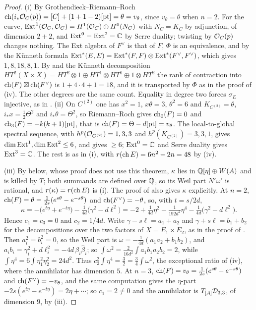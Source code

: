 \begin{proof}
(i) By Grothendieck--Riemann--Roch $\operatorname{ch}(i_{*}\mathcal{O}_{C}(p))=[C]+(1+1-2)[\mathrm{pt}]
=\theta=v_{\theta}$, since $v_{\theta}=\theta$ when $n=2$. For the curve,
$\operatorname{Ext}^{1}(\mathcal{O}_{C},\mathcal{O}_{C})=H^{1}(\mathcal{O}_{C})\oplus H^{0}(N_{C})$ with
$N_{C}=K_{C}$ by adjunction, of dimension $2+2$, and $\operatorname{Ext}^{0}=\operatorname{Ext}^{2}=\mathbb{C}$ by
Serre duality; twisting by $\mathcal{O}_{C}(p)$ changes nothing. The Ext algebra of
$F^{\vee}$ is that of $F$, $\Phi$ is an equivalence, and by the K\"unneth
formula $\operatorname{Ext}^{*}(E,E)=\operatorname{Ext}^{*}(F,F)\otimes\operatorname{Ext}^{*}(F^{\vee},F^{\vee})$, which
gives $1,8,18,8,1$. By  and the K\"unneth
decomposition $HT^{2}(X\times X)=HT^{2}\otimes1\oplus HT^{1}\otimes HT^{1}\oplus
1\otimes HT^{2}$ the rank of contraction into $\operatorname{ch}(F)\boxtimes\operatorname{ch}(F^{\vee})$ is
$1+4\cdot4+1=18$, and it is transported by $\Phi$ as in the proof of
(iv). The other degrees are the same count. Equality in
degree two forces $\sigma_{E}$ injective, as in .
(ii) On $C^{(2)}$ one has $x^{2}=1$, $x\theta=3$, $\theta^{2}=6$ and
$K_{C^{(2)}}=\theta$, $i_{*}x=\frac12\Theta^{2}$ and $i_{*}\theta=\Theta^{2}$, so
Riemann--Roch gives $\operatorname{ch}_{2}(F)=0$ and $\operatorname{ch}_{3}(F)=-k(k+1)[\mathrm{pt}]$, that
is $\operatorname{ch}(F)=\Theta-d[\mathrm{pt}]=v_{\theta}$. The local-to-global spectral
sequence, with $h^{p}(\mathcal{O}_{C^{(2)}})=1,3,3$ and $h^{p}(K_{C^{(2)}})=3,3,1$,
gives $\dim\operatorname{Ext}^{1},\dim\operatorname{Ext}^{2}\le6$, and  gives
$\ge6$; $\operatorname{Ext}^{0}=\mathbb{C}$ and Serre duality gives $\operatorname{Ext}^{3}=\mathbb{C}$. The rest is as
in (i), with $r(\operatorname{ch} E)=6n^{2}-2n=48$ by (iv).

(iii) By  below, whose proof does not use this theorem,
$\kappa$ lies in $\mathbb{Q}[\eta]\oplus W(A)$ and is killed by $T$; both summands
are defined over $\mathbb{Q}$, so its Weil part $N'\omega'$ is rational, and
$r(\kappa)=r(\operatorname{ch} E)$ is (i). The proof of
 also gives $\kappa$ explicitly. At $n=2$,
$\operatorname{ch}(F)=\theta=\frac{1}{2s}(e^{s\theta}-e^{-s\theta})$ and
$\operatorname{ch}(F^{\vee})=-\theta$, so, with $t=s/2d$,
\[
  \kappa=-\bigl(e^{t\eta}+e^{-t\eta}\bigr)-\tfrac{1}{4d}\bigl(\gamma^{2}-d\ell^{2}\bigr)
  =-2+\tfrac{1}{4d}\eta^{2}-\tfrac{1}{192d^{2}}\eta^{4}
   -\tfrac{1}{4d}\bigl(\gamma^{2}-d\ell^{2}\bigr).
\]
Hence $c_{1}=c_{3}=0$ and $c_{2}=1/4d$. Write $\gamma-s\ell=a_{1}+a_{2}$ and
$\gamma+s\ell=b_{1}+b_{2}$ for the decompositions over the two factors of
$X=E_{1}\times E_{2}$, as in the proof of . Then
$a_{i}^{2}=b_{i}^{2}=0$, so the Weil part is
$\omega=-\frac{1}{4d}(a_{1}a_{2}+b_{1}b_{2})$, and
$a_{i}b_{i}=\gamma_{i}^{2}+d\ell_{i}^{2}=-4d\,\beta_{i}\widehat\beta_{i}$; so
$\int\omega^{2}=\frac{2}{16d^{2}}\int a_{1}b_{1}a_{2}b_{2}=2$, while
$\int\eta^{4}=6\int\eta_{1}^{2}\eta_{2}^{2}=24d^{2}$. Thus
$c_{2}^{2}\int\eta^{4}=\frac32=\frac34\int\omega^{2}$, the exceptional ratio of
(iv), where the annihilator has dimension $5$. At
$n=3$, $\operatorname{ch}(F)=v_{\theta}=\frac{1}{2s}(e^{s\theta}-e^{-s\theta})$ and
$\operatorname{ch}(F^{\vee})=-v_{\theta}$, and the same computation gives the
$\eta$-part $-2s(e^{t\eta}-e^{-t\eta})=2\eta+\cdots$; so $c_{1}=2\ne0$ and the
annihilator is $T_{[A]}\mathcal{D}_{3,3}$, of dimension $9$, by
(iii).


\end{proof}
